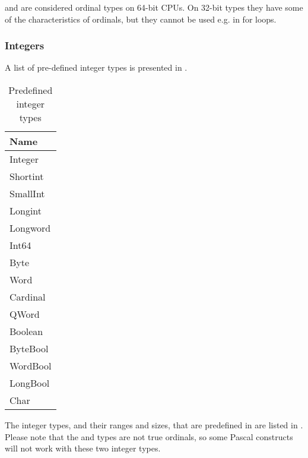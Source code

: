 \begin{remark}
 and  are considered ordinal types on 64-bit CPUs. On 32-bit types
they have some of the characteristics of ordinals, but they cannot be used
e.g. in for loops.
\end{remark}

\subsubsection{Integers}
A list of pre-defined integer types is presented in .

    
   
   
	 
   
    
   

%
\begin{table}[ht]
\caption{Predefined integer types}
\label{tab:integerstyp}
\begin{center}
\begin{tabular}{l}
Name\\ \hline
Integer \\
Shortint \\
SmallInt \\
Longint \\
Longword \\
Int64 \\
Byte \\
Word \\
Cardinal \\
QWord \\
Boolean \\
ByteBool \\
WordBool \\
LongBool \\
Char \\ \hline
\end{tabular}
\end{center}
\end{table}
The integer types, and their ranges and sizes, that are predefined in
\fpc are listed in . Please note that
the  and  types are not true ordinals, so
some Pascal constructs will not work with these two integer types.

